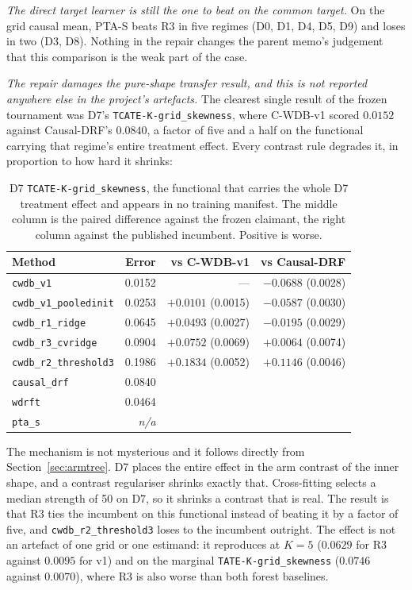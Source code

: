 \documentclass[11pt,a4paper]{article}
\theoremstyle{definition}
\theoremstyle{remark}
\begin{document}
\emph{The direct target learner is still the one to beat on the common target.}
On the grid causal mean, PTA-S beats R3 in five regimes (D0, D1, D4, D5, D9) and
loses in two (D3, D8). Nothing in the repair changes the parent memo's judgement
that this comparison is the weak part of the case.

\emph{The repair damages the pure-shape transfer result, and this is not
reported anywhere else in the project's artefacts.} The clearest single result of
the frozen tournament was D7's \texttt{TCATE-K-grid\_skewness}, where C-WDB-v1
scored $0.0152$ against Causal-DRF's $0.0840$, a factor of five and a half on the
functional carrying that regime's entire treatment effect. Every contrast rule
degrades it, in proportion to how hard it shrinks:

\begin{table}[htbp]
\centering
\caption{D7 \texttt{TCATE-K-grid\_skewness}, the functional that carries the whole
D7 treatment effect and appears in no training manifest. The middle column is the
paired difference against the frozen claimant, the right column against the
published incumbent. Positive is worse.}
\label{tab:d7skew}
\small
\begin{tabular}{@{}lrrr@{}}
\toprule
Method & Error & vs C-WDB-v1 & vs Causal-DRF \\
\midrule
\texttt{cwdb\_v1} & 0.0152 & --- & $-0.0688$ (0.0028) \\
\texttt{cwdb\_v1\_pooledinit} & 0.0253 & $+0.0101$ (0.0015) & $-0.0587$ (0.0030) \\
\texttt{cwdb\_r1\_ridge} & 0.0645 & $+0.0493$ (0.0027) & $-0.0195$ (0.0029) \\
\texttt{cwdb\_r3\_cvridge} & 0.0904 & $+0.0752$ (0.0069) & $+0.0064$ (0.0074) \\
\texttt{cwdb\_r2\_threshold3} & 0.1986 & $+0.1834$ (0.0052) & $+0.1146$ (0.0046) \\
\midrule
\texttt{causal\_drf} & 0.0840 & & \\
\texttt{wdrft} & 0.0464 & & \\
\texttt{pta\_s} & \emph{n/a} & & \\
\bottomrule
\end{tabular}
\end{table}

The mechanism is not mysterious and it follows directly from
Section~\ref{sec:armtree}. D7 places the entire effect in the arm contrast of the
inner shape, and a contrast regulariser shrinks exactly that. Cross-fitting
selects a median strength of 50 on D7, so it shrinks a contrast that is real. The
result is that R3 ties the incumbent on this functional instead of beating it by
a factor of five, and \texttt{cwdb\_r2\_threshold3} loses to the incumbent
outright. The effect is not an artefact of one grid or one estimand: it
reproduces at $K = 5$ ($0.0629$ for R3 against $0.0095$ for v1) and on the
marginal \texttt{TATE-K-grid\_skewness} ($0.0746$ against $0.0070$), where R3 is
also worse than both forest baselines.
\end{document}
